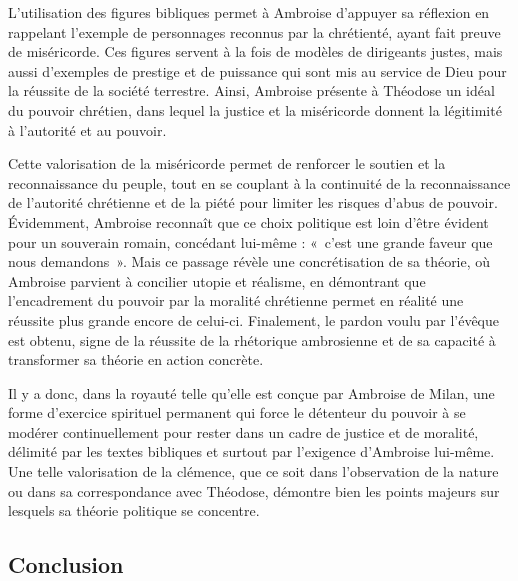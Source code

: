 \bigskip

L'utilisation des figures bibliques permet à Ambroise d'appuyer sa réflexion en rappelant l'exemple de personnages reconnus par la chrétienté, ayant fait preuve de miséricorde. Ces figures servent à la fois de modèles de dirigeants justes, mais aussi d'exemples de prestige et de puissance qui sont mis au service de Dieu pour la réussite de la société terrestre. Ainsi, Ambroise présente à Théodose un idéal du pouvoir chrétien, dans lequel la justice et la miséricorde donnent la légitimité à l’autorité et au pouvoir.

\bigskip

Cette valorisation de la miséricorde permet de renforcer le soutien et la reconnaissance du peuple, tout en se couplant à la continuité de la reconnaissance de l’autorité chrétienne et de la piété pour limiter les risques d’abus de pouvoir. Évidemment, Ambroise reconnaît que ce choix politique est loin d'être évident pour un souverain romain, concédant lui-même : «~c’est une grande faveur que nous demandons~». Mais ce passage révèle une concrétisation de sa théorie, où Ambroise parvient à concilier utopie et réalisme, en démontrant que l'encadrement du pouvoir par la moralité chrétienne permet en réalité une réussite plus grande encore de celui-ci. Finalement, le pardon voulu par l'évêque est obtenu, signe de la réussite de la rhétorique ambrosienne et de sa capacité à transformer sa théorie en action concrète.

\bigskip

Il y a donc, dans la royauté telle qu'elle est conçue par Ambroise de Milan, une forme d’exercice spirituel permanent qui force le détenteur du pouvoir à se modérer continuellement pour rester dans un cadre de justice et de moralité, délimité par les textes bibliques et surtout par l'exigence d'Ambroise lui-même. Une telle valorisation de la clémence, que ce soit dans l'observation de la nature ou dans sa correspondance avec Théodose, démontre bien les points majeurs sur lesquels sa théorie politique se concentre.

\bigskip

\subsection*{Conclusion}

